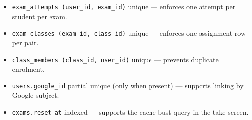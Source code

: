 \begin{itemize}
  \item \texttt{exam\_attempts (user\_id, exam\_id)} unique --- enforces one attempt per student per exam.
  \item \texttt{exam\_classes (exam\_id, class\_id)} unique --- enforces one assignment row per pair.
  \item \texttt{class\_members (class\_id, user\_id)} unique --- prevents duplicate enrolment.
  \item \texttt{users.google\_id} partial unique (only when present) --- supports linking by Google subject.
  \item \texttt{exams.reset\_at} indexed --- supports the cache-bust query in the take screen.
\end{itemize}
